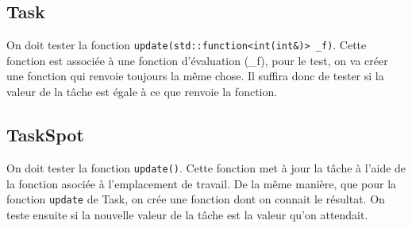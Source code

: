 \subsection{Task}

On doit tester la fonction \texttt{update(std::function<int(int\&)> \_f)}. Cette fonction est associée à une fonction d'évaluation (\_f), pour le test, on va créer une fonction qui renvoie toujours la même chose. Il suffira donc de tester si la valeur de la tâche est égale à ce que renvoie la fonction.

\subsection{TaskSpot}

On doit tester la fonction \texttt{update()}. Cette fonction met à jour la tâche à l'aide de la fonction asociée à l'emplacement de travail. De la même manière, que pour la fonction \texttt{update} de Task, on crée une fonction dont on connait le résultat. On teste ensuite si la nouvelle valeur de la tâche est la valeur qu'on attendait.
